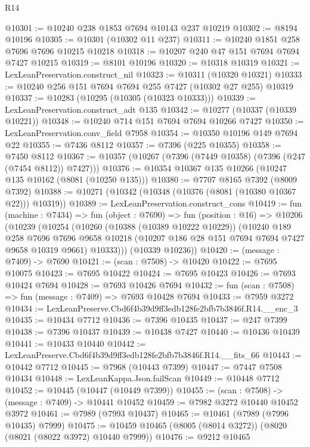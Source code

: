 \begin{lexlean}{R14}
\begin{coremodule}
@10301 := @10240 @238 @1853 @7694 @10143 @237 @10219
@10302 := @8194 @10196
@10305 := @10301 (@10302 @11 @237)
@10311 := @10240 @1851 @258 @7696 @7696 @10215 @10218
@10318 := @10207 @240 @47 @151 @7694 @7694 @7427 @10215
@10319 := @8101 @10196
@10320 := @10318 @10319
@10321 := LexLeanPreservation.construct_nil
@10323 := @10311 (@10320 @10321)
@10333 := @10240 @256 @151 @7694 @7694 @255 @7427 (@10302 @27 @255) @10319
@10337 := @10283 (@10295 (@10305 (@10323 @10333)))
@10339 := LexLeanPreservation.construct_adt @135
@10342 := @10277 (@10337 (@10339 @10221))
@10348 := @10240 @714 @151 @7694 @7694 @10266 @7427
@10350 := LexLeanPreservation.conv_field @7958
@10354 := @10350 @10196 @149 @7694 @22
@10355 := @7436 @8112
@10357 := @7396 (@225 @10355)
@10358 := @7450 @8112
@10367 := @10357 (@10267 (@7396 (@7449 @10358) (@7396 (@247 (@7454 @8112)) @7427)))
@10376 := @10354 @10367 @135 @10266 (@10247 @135 @10162 (@8081 (@10250 @135)))
@10380 := @7707 @8165 @7392 (@8009 @7392)
@10388 := @10271 (@10342 (@10348 (@10376 (@8081 (@10380 @10367 @22))) @10319))
@10389 := LexLeanPreservation.construct_cons
@10419 := fun (machine : @7434) =>
  fun (object : @7690) =>
  fun (position : @16) =>
  @10206
    (@10239
      (@10254
        (@10260
          (@10388 (@10389 @10222 @10229))
          (@10240
            @189
            @258
            @7696
            @7696
            @9658
            @10218
            (@10207 @186 @28 @151 @7694 @7694 @7427 @9658 @10319 @9661)
            @10333)))
      (@10339 @10236))
@10420 := (message : @7409) -> @7690
@10421 := (scan : @7508) -> @10420
@10422 := @7695 @10075
@10423 := @7695 @10422
@10424 := @7695 @10423
@10426 := @7693 @10424 @7694
@10428 := @7693 @10426 @7694
@10432 := fun (scan : @7508) => fun (message : @7409) => @7693 @10428 @7694
@10433 := @7959 @3272
@10434 := LexLeanPreserve.Cbd6f4b39d9ff3edb128fe2bfb7b3846f.R14.__enc_3
@10435 := @10434 @7712
@10436 := @7396 @10435
@10437 := @247 @7399
@10438 := @7396 @10437
@10439 := @10438 @7427
@10440 := @10436 @10439
@10441 := @10433 @10440
@10442 := LexLeanPreserve.Cbd6f4b39d9ff3edb128fe2bfb7b3846f.R14.__fits_66
@10443 := @10442 @7712
@10445 := @7968 (@10443 @7399)
@10447 := @7447 @7508 @10434
@10448 := LexLeanKappa.Json.failScan
@10449 := @10448 @7712
@10452 := @10445 (@10447 (@10449 @7399))
@10455 := (scan : @7508) -> (message : @7409) -> @10441 @10452
@10459 := @7982 @3272 @10440 @10452 @3972
@10461 := @7989 (@7993 @10437)
@10465 := @10461 (@7989 (@7996 @10435) @7999)
@10475 := @10459 @10465 (@8005 (@8014 @3272)) (@8020 (@8021 (@8022 @3972) @10440 @7999))
@10476 := @9212 @10465

\end{coremodule}
\end{lexlean}
